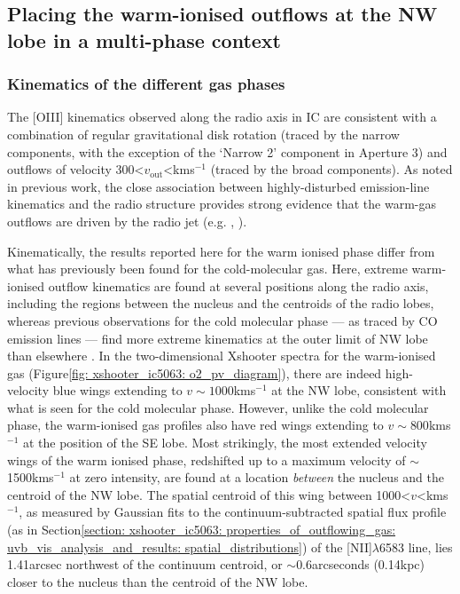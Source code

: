 \subsection{Placing the warm-ionised outflows at the NW lobe in a multi-phase context}
\label{section: xshooter_ic5063: discussion: multiphase}

\subsubsection{Kinematics of the different gas phases}
\label{section: xshooter_ic5063: discussion: multiphase: kinematics}

The [OIII] kinematics observed along the radio axis in IC are consistent with a combination of regular gravitational disk rotation (traced by the narrow components, with the exception of the `Narrow 2' component in Aperture 3) and outflows of velocity 300\;\textless\;$v_\mathrm{out}$\;\textless{}\;km\;s$^{-1}$ (traced by the broad components). As noted in previous work, the close association between highly-disturbed emission-line kinematics and the radio structure provides strong evidence that the warm-gas outflows are driven by the radio jet (e.g. \citealt{Morganti2007}, \citealt{Tadhunter2014}).

Kinematically, the results reported here for the warm ionised phase differ from what has previously been found for the cold-molecular gas. Here, extreme warm-ionised outflow kinematics are found at several positions along the radio axis, including the regions between the nucleus and the centroids of the radio lobes, whereas previous observations for the cold molecular phase --- as traced by CO emission lines --- find more extreme kinematics at the outer limit of NW lobe than elsewhere \citep{Morganti2015, Oosterloo2017}. In the two-dimensional Xshooter spectra for the warm-ionised gas (Figure\;\ref{fig: xshooter_ic5063: o2_pv_diagram}), there are indeed high-velocity blue wings extending to $v\sim1000$\;km\;s$^{-1}$ at the NW lobe, consistent with what is seen for the cold molecular phase. However, unlike the cold molecular phase, the warm-ionised gas profiles also have red wings extending to $v\sim800$\;km\;s$^{-1}$ at the position of the SE lobe. Most strikingly, the most extended velocity wings of the warm ionised phase, redshifted up to a maximum velocity of $\sim$1500\;km\;s$^{-1}$ at zero intensity, are found at a location \textit{between} the nucleus and the centroid of the NW lobe. The spatial centroid of this wing between \mbox{1000\;\textless\;$v$\;\textless{}\;km\;s$^{-1}$}, as measured by Gaussian fits to the continuum-subtracted spatial flux profile (as in Section\;\ref{section: xshooter_ic5063: properties_of_outflowing_gas: uvb_vis_analysis_and_results: spatial_distributions}) of the [NII]$\lambda$6583 line, lies 1.41\;arcsec northwest of the continuum centroid, or $\sim$0.6\;arcseconds (0.14\;kpc) closer to the nucleus than the centroid of the NW lobe.

